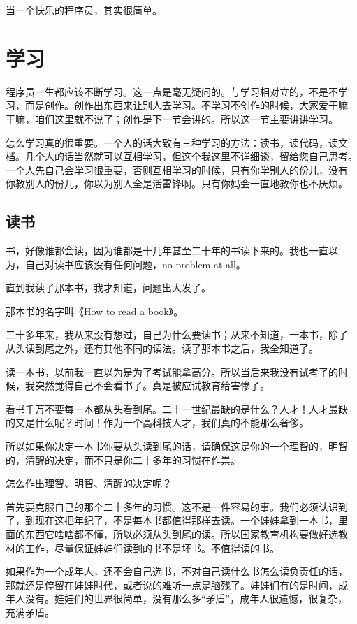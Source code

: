\documentclass[10pt]{article}
\begin{document}
\begin{CJK*}{UTF8}{simsun}
当一个快乐的程序员，其实很简单。

\section{学习}

程序员一生都应该不断学习。这一点是毫无疑问的。与学习相对立的，不是不学
习，而是创作。创作出东西来让别人去学习。不学习不创作的时候，大家爱干嘛
干嘛，咱们这里就不说了；创作是下一节会讲的。所以这一节主要讲讲学习。

怎么学习真的很重要。一个人的话大致有三种学习的方法：读书，读代码，读文
档。几个人的话当然就可以互相学习，但这个我这里不详细谈，留给您自己思考。
一个人先自己会学习很重要，否则互相学习的时候，只有你学别人的份儿，没有
你教别人的份儿，你以为别人全是活雷锋啊。只有你妈会一直地教你也不厌烦。

\subsection{读书}

书，好像谁都会读，因为谁都是十几年甚至二十年的书读下来的。我也一直以
为，自己对读书应该没有任何问题，no problem at all。

直到我读了那本书，我才知道，问题出大发了。

那本书的名字叫《How to read a book》。

二十多年来，我从来没有想过，自己为什么要读书；从来不知道，一本书，除了
从头读到尾之外，还有其他不同的读法。读了那本书之后，我全知道了。

读一本书，以前我一直以为是为了考试能拿高分。所以当后来我没有试考了的时
候，我突然觉得自己不会看书了。真是被应试教育给害惨了。

看书千万不要每一本都从头看到尾。二十一世纪最缺的是什么？人才！人才最缺
的又是什么呢？时间！作为一个高科技人才，我们真的不能那么奢侈。

所以如果你决定一本书你要从头读到尾的话，请确保这是你的一个理智的，明智
的，清醒的决定，而不只是你二十多年的习惯在作祟。

怎么作出理智、明智、清醒的决定呢？

首先要克服自己的那个二十多年的习惯。这不是一件容易的事。我们必须认识到
了，到现在这把年纪了，不是每本书都值得那样去读。一个娃娃拿到一本书，里
面的东西它啥啥都不懂，所以必须从头到尾的读。所以国家教育机构要做好选教
材的工作，尽量保证娃娃们读到的书不是坏书。不值得读的书。

如果作为一个成年人，还不会自己选书，不对自己读什么书怎么读负责任的话，
那就还是停留在娃娃时代，或者说的难听一点是脑残了。娃娃们有的是时间，成
年人没有。娃娃们的世界很简单，没有那么多“矛盾”，成年人很遗憾，很复杂，
充满矛盾。


\end{CJK*}
\end{document}
